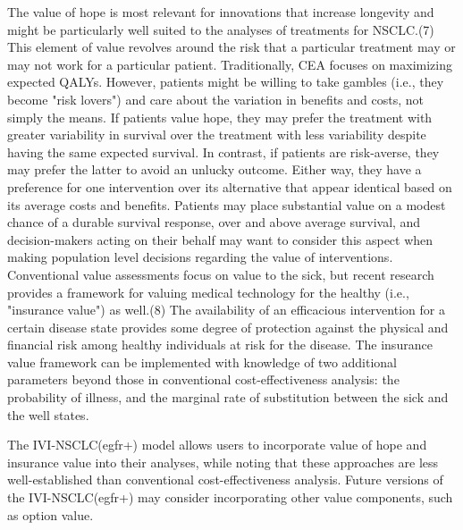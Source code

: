 \documentclass[11pt,final,fleqn]{article}\usepackage[]{graphicx}\usepackage[]{color}
\theoremstyle{plain}
\begin{document}
{The value of hope is most relevant for innovations that increase longevity and might be particularly well suited to the analyses of treatments for NSCLC.(7) This element of value revolves around the risk that a particular treatment may or may not work for a particular patient. Traditionally, CEA focuses on maximizing expected QALYs. However, patients might be willing to take gambles (i.e., they become "risk lovers") and care about the variation in benefits and costs, not simply the means. If patients value hope, they may prefer the treatment with greater variability in survival over the treatment with less variability despite having the same expected survival. In contrast, if patients are risk-averse, they may prefer the latter to avoid an unlucky outcome. Either way, they have a preference for one intervention over its alternative that appear identical based on its average costs and benefits. Patients may place substantial value on a modest chance of a durable survival response, over and above average survival, and decision-makers acting on their behalf may want to consider this aspect when making population level decisions regarding the value of interventions. 
Conventional value assessments focus on value to the sick, but recent research provides a framework for valuing medical technology for the healthy (i.e., "insurance value") as well.(8) The availability of an efficacious intervention for a certain disease state provides some degree of protection against the physical and financial risk among healthy individuals at risk for the disease. The insurance value framework can be implemented with knowledge of two additional parameters beyond those in conventional cost-effectiveness analysis: the probability of illness, and the marginal rate of substitution between the sick and the well states. 

The IVI-NSCLC(egfr+) model allows users to incorporate value of hope and insurance value into their analyses, while noting that these approaches are less well-established than conventional cost-effectiveness analysis. Future versions of the IVI-NSCLC(egfr+) may consider incorporating other value components, such as option value.


}
\end{document}
